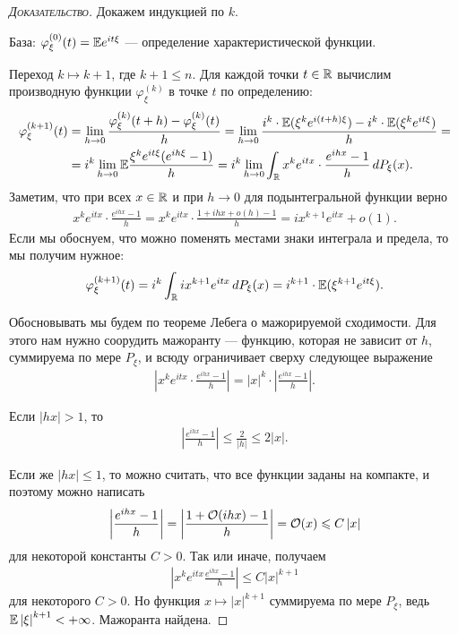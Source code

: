 \documentclass[../main.tex]{subfiles}
\begin{document}
\begin{proof}[\normalfont\textsc{Доказательство}]
 Докажем индукцией по $ k $.

 База: $ \varphi_\xi^{(0)}(t) = \mathbb E e^{it\xi} $ --- определение характеристической функции.

 Переход $ k \mapsto k + 1 $, где $ k +1 \leqslant n $. Для каждой точки $ t \in \mathbb{R} $ вычислим производную функции $ \varphi_\xi^{(k)} $  в точке $ t $ по определению:
 \begin{align*}
  \varphi_\xi^{(k+1)}(t) &= \lim_{h \to 0} \frac{\varphi_\xi^{(k)}(t+h) - \varphi_\xi^{(k)}(t)}{h} = \lim_{h \to 0} \frac{i^{k} \cdot \mathbb E(\xi^{k}e^{i(t+h)\xi}) - i^{k} \cdot \mathbb E(\xi^{k}e^{it\xi})}{h} = \\
  &= i^{k} \lim_{h \to 0} \mathbb E \frac{\xi^{k}e^{it\xi} (e^{ih\xi} - 1)}{h} = i^{k} \lim_{h \to 0} \int_{\mathbb{R}} x^{k}e^{itx} \cdot \frac{e^{ihx}-1}{h}\,dP_\xi(x).
 \end{align*} Заметим, что при всех $ x \in \mathbb{R} $ и при $ h \to 0 $ для подынтегральной функции верно
 \begin{align*}
  x^{k}e^{itx} \cdot \frac{e^{ihx} - 1}{h}  = x^{k}e^{itx} \cdot \frac{1 + ihx + o(h) - 1}{h} = ix^{k+1}e^{itx} + o(1).
 \end{align*} Если мы обоснуем, что можно поменять местами знаки интеграла и предела, то мы получим нужное:
 \begin{align*}
  \varphi_\xi^{(k+1)}(t) = i^{k} \int_{\mathbb{R}} ix^{k+1}e^{itx}\,dP_\xi(x) =    i^{k+1} \cdot \mathbb E (\xi^{k+1}e^{it\xi}).
 \end{align*}

 Обосновывать мы будем по теореме Лебега о мажорируемой сходимости. Для этого нам нужно соорудить мажоранту --- функцию, которая не зависит от $ h $, суммируема по мере $ P_\xi $, и всюду ограничивает сверху следующее выражение
 \begin{align*}
  \left| x^{k}e^{itx} \cdot \frac{e^{ihx}-1}{h} \right| = \left| x \right|^{k} \cdot \left| \frac{e^{ihx}-1}{h} \right|.
 \end{align*}

 Если $ \left| hx \right| > 1 $, то
 \begin{align*}
  \left| \frac{e^{ihx}-1}{h} \right| \leqslant \frac{2}{\left| h \right|} \leqslant 2 \left| x \right|.
 \end{align*}

 Если же $ \left| h x \right| \leqslant 1 $, то можно считать, что все функции заданы на компакте, и поэтому можно написать
 \begin{align*}
  \left| \frac{e^{ihx}-1}{h} \right| = \left| \frac{1 + \mathcal{O}(ihx) - 1}{h} \right| = \mathcal{O}(x) \leqslant C \left| x \right|
 \end{align*} для некоторой константы $ C>0 $. Так или иначе, получаем
 \begin{align*}
  \left| x^{k}e^{itx}\frac{e^{ihx}-1}{h} \right| \leqslant C \left| x \right|^{k+1}
 \end{align*} для некоторого $ C > 0 $. Но функция $ x \mapsto  \left| x \right|^{k+1} $ суммируема по мере $ P_\xi $, ведь $ \mathbb E \left| \xi \right|^{k+1}  < +\infty$. Мажоранта найдена.


\end{proof}
\end{document}
